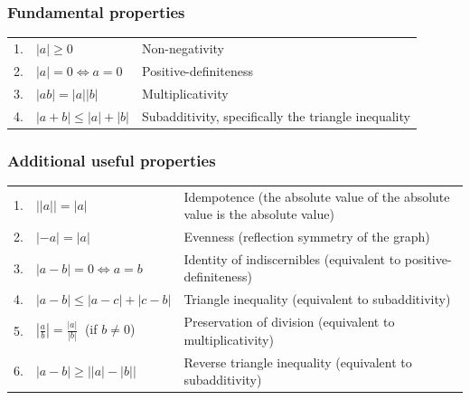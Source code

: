 \subsubsection*{Fundamental properties \cite{wiki/Absolute-value}} \label{Basic Functions/Absolute Value function or Modulus Function/Fundamental properties}

\begin{customArrayStretch}{1.2}
\begin{tabular}{r l l}
     1. & ${\displaystyle |a|\geq 0}$ & Non-negativity \\
     
     2. & ${\displaystyle |a|=0\iff a=0}$ & Positive-definiteness \\
     
     3. & ${\displaystyle |ab|=\left|a\right|\left|b\right|}$ & 	Multiplicativity \\
     
     4. & ${\displaystyle |a+b|\leq |a|+|b|}$ & 	Subadditivity, specifically the triangle inequality \\
\end{tabular}
\end{customArrayStretch}

\subsubsection*{Additional useful properties \cite{wiki/Absolute-value}} \label{Basic Functions/Absolute Value function or Modulus Function/Additional useful properties}

\begin{customArrayStretch}{1.5}
\begin{tabular}{r l p{13cm}}
     1. & ${\displaystyle {\bigl |}\left|a\right|{\bigr |}=|a|}$ & 	Idempotence (the absolute value of the absolute value is the absolute value) \\
     
     2. & ${\displaystyle \left|-a\right|=|a|}$ & Evenness (reflection symmetry of the graph) \\
     
     3. & ${\displaystyle |a-b|=0\iff a=b}$ & 	Identity of indiscernibles (equivalent to positive-definiteness) \\
     
     4. & ${\displaystyle |a-b|\leq |a-c|+|c-b|}$ & 	Triangle inequality (equivalent to subadditivity) \\
     
     5. & ${\displaystyle \left|{\frac {a}{b}}\right|={\frac {|a|}{|b|}}\ }$ (if ${\displaystyle b\neq 0}$) & 	Preservation of division (equivalent to multiplicativity) \\
     
     6. & ${\displaystyle |a-b|\geq {\bigl |}\left|a\right|-\left|b\right|{\bigr |}}$ & 	Reverse triangle inequality (equivalent to subadditivity) \\
\end{tabular}
\end{customArrayStretch}

